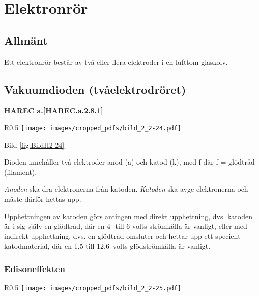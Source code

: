 \section{Elektronrör}
\label{elektronrör}

\subsection{Allmänt}

Ett elektronrör består av två eller flera elektroder i en lufttom glaskolv.

\subsection{Vakuumdioden (tvåelektrodröret)}
\textbf{HAREC a.\ref{HAREC.a.2.8.1}\label{myHAREC.a.2.8.1}}
\label{vakuumdioden}

\begin{wrapfigure}[9]{R}{0.5\textwidth}
\texttt{[image: images/cropped\_pdfs/bild\_2\_2-24.pdf]}
\caption{Schemasymboler för dioder}
\label{fig:BildII2-24}
\end{wrapfigure}

Bild \ref{fig:BildII2-24}

Dioden innehåller två elektroder anod (a) och katod (k), med f där
f = glödtråd (filament).

\emph{Anoden} ska dra elektronerna från katoden.
\emph{Katoden} ska avge elektronerna och måste därför hettas upp.

Upphettningen av katoden görs antingen med direkt upphettning, dvs. katoden
är i sig själv en glödtråd, där en 4- till 6-volts strömkälla är vanligt, eller
med indirekt upphettning, dvs. en glödtråd omsluter och hettar upp ett
speciellt katodmaterial, där en 1,5 till 12,6~volts glödströmkälla är vanligt.

\subsubsection{Edisoneffekten}

\begin{wrapfigure}[12]{R}{0.5\textwidth}
\texttt{[image: images/cropped\_pdfs/bild\_2\_2-25.pdf]}
\caption{Edisoneffekten}
\label{fig:BildII2-25}
\end{wrapfigure}

